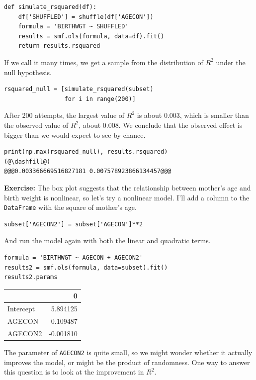 \begin{lstlisting}[]
def simulate_rsquared(df):
    df['SHUFFLED'] = shuffle(df['AGECON'])
    formula = 'BIRTHWGT ~ SHUFFLED'
    results = smf.ols(formula, data=df).fit()
    return results.rsquared
\end{lstlisting}

If we call it many times, we get a sample from the distribution of
\(R^2\) under the null hypothesis.

\begin{lstlisting}[]
rsquared_null = [simulate_rsquared(subset)
                 for i in range(200)]
\end{lstlisting}

After 200 attempts, the largest value of \(R^2\) is about 0.003, which
is smaller than the observed value of \(R^2\), about 0.008. We conclude
that the observed effect is bigger than we would expect to see by
chance.

\begin{lstlisting}[]
print(np.max(rsquared_null), results.rsquared)
(@\dashfill@)
@@@0.003366669516827181 0.007578923866134457@@@
\end{lstlisting}

\textbf{Exercise:} The box plot suggests that the relationship between
mother's age and birth weight is nonlinear, so let's try a nonlinear
model. I'll add a column to the \passthrough{\lstinline!DataFrame!} with
the square of mother's age.

\begin{lstlisting}[]
subset['AGECON2'] = subset['AGECON']**2
\end{lstlisting}

And run the model again with both the linear and quadratic terms.

\begin{lstlisting}[]
formula = 'BIRTHWGT ~ AGECON + AGECON2'
results2 = smf.ols(formula, data=subset).fit()
results2.params
\end{lstlisting}

\begin{tabular}{lr}
\midrule
{} &         0 \\
\midrule
Intercept &  5.894125 \\
AGECON    &  0.109487 \\
AGECON2   & -0.001810 \\
\midrule
\end{tabular}

The parameter of \passthrough{\lstinline!AGECON2!} is quite small, so we
might wonder whether it actually improves the model, or might be the
product of randomness. One way to answer this question is to look at the
improvement in \(R^2\).

